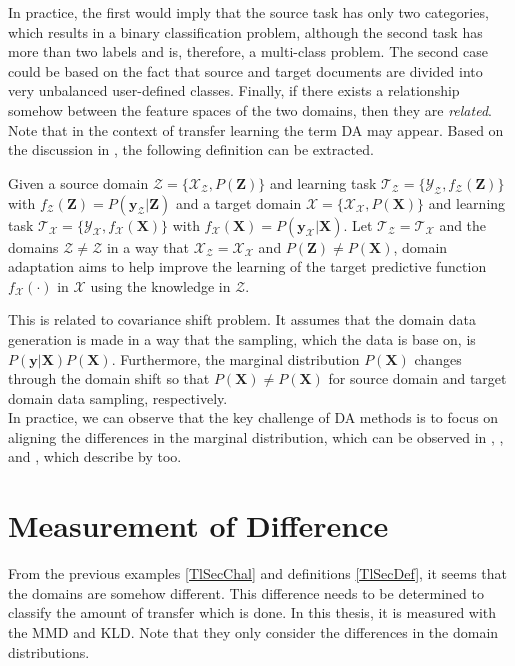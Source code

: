 In practice, the first would imply that the source task has only two categories, which results in a binary classification problem, although the second task has more than two labels and is, therefore, a multi-class problem.
The second case could be based on the fact that source and target documents are divided into very unbalanced user-defined classes.
Finally, if there exists a relationship somehow between the feature spaces of the two domains, then they are \textit{related}.\cite{Pan.2010}\\
Note that in the context of transfer learning the term \ac{DA} may appear.
Based on the discussion in \cite{Pan.2011}, the following definition can be extracted.
\begin{mDef}\label{DefDa}
	Given a source domain $\mathcal{Z}=\{\mathcal{X}_\mathcal{Z},P(\mathbf{Z})\}$ and learning task $\mathcal{T_Z}=\{\mathcal{Y_Z},f_\mathcal{Z}(\mathbf{Z})\}$ with $f_\mathcal{Z}(\mathbf{Z}) = P(\mathbf{y}_\mathcal{Z}|\mathbf{Z})$ and a target domain $\mathcal{X}=\{\mathcal{X}_\mathcal{X},P(\mathbf{X})\}$ and learning task $\mathcal{T_X}=\{\mathcal{Y_X},f_\mathcal{X}(\mathbf{X})\}$ with $f_\mathcal{X}(\mathbf{X}) = P(\mathbf{y}_\mathcal{X}|\mathbf{X})$. Let $\mathcal{T_Z} = \mathcal{T_X}$ and the domains $\mathcal{Z} \neq \mathcal{Z}$ in a way that $\mathcal{X}_\mathcal{Z} = \mathcal{X}_\mathcal{X}$ and $P(\mathbf{Z}) \neq P(\mathbf{X})$, domain adaptation aims to help improve the learning of the target predictive function $f_\mathcal{X}(\cdot)$ in $\mathcal{X}$ using the knowledge in $\mathcal{Z}$.
\end{mDef}
This is related to covariance shift problem.\cite{Pan.2011}
It assumes that the domain data generation is made in a way that the sampling, which the data is base on, is $P(\mathbf{y}\vert \mathbf{X})P(\mathbf{X})$.
Furthermore,  the marginal distribution $P(\mathbf{X})$ changes through the domain shift so that $P(\mathbf{X}) \neq P(\mathbf{X})$ for source domain and target domain data sampling, respectively.\cite[p. 8-9]{QuinoneroCandela.2009}\\
In practice, we can observe that the key challenge of \acl{DA} methods is to focus on aligning the differences in the marginal distribution, which can be observed in \cite{Pan.2011}, \cite{Long.}, \cite{Fernando.} and \cite{Arnold.2007}, which describe by \cite{Pan.2011} too.

\section{Measurement of Difference}\label{TlSecMeasure}
From the previous examples \ref{TlSecChal} and definitions \ref{TlSecDef}, it seems that the domains are somehow different.
This difference needs to be determined to classify the amount of transfer which is done.
In this thesis, it is measured with the \ac{MMD} and \ac{KLD}.
Note that they only consider the differences in the domain distributions.
